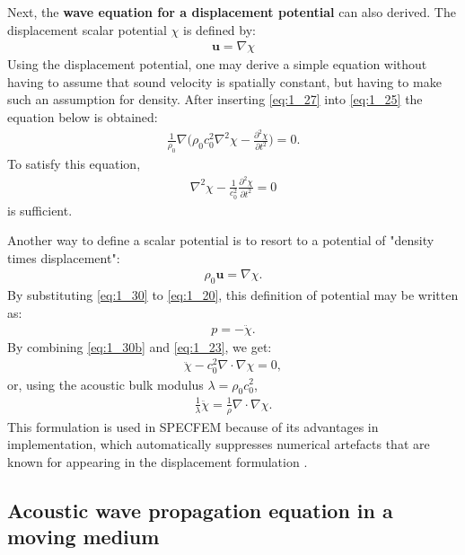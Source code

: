         Next, the \textbf{wave equation for a displacement potential} can also derived. The displacement scalar potential $\chi$ is defined by:
        \begin{align} \label{eq:1_27}
            \bm{u}=\nabla\chi
        \end{align}
        Using the displacement potential, one may derive a simple equation without having to assume that sound velocity is spatially constant,
but having to make such an assumption for density. After inserting \ref{eq:1_27} into \ref{eq:1_25} the equation below is obtained:
        \begin{align} \label{eq:1_28}
            \frac{1}{\rho_0}\nabla\biggl( \rho_0 c_0^2 \nabla^2\chi-\frac{\partial^2 \chi}{\partial t^2} \biggr)=0.
        \end{align}
        To satisfy this equation,
        \begin{align} \label{eq:1_29}
            \nabla^2\chi-\frac{1}{c_0^2}\frac{\partial^2 \chi}{\partial t^2}=0
        \end{align}
        is sufficient.

        Another way to define a scalar potential is to resort to a potential of "density times displacement":
        \begin{align} \label{eq:1_30}
            \rho_0\bm{u}=\nabla\chi.
        \end{align}
        By substituting \ref{eq:1_30} to \ref{eq:1_20}, this definition of potential may be written as:
        \begin{align} \label{eq:1_30b}
            p=-\ddot{\chi}.
        \end{align}
        By combining \ref{eq:1_30b} and \ref{eq:1_23}, we get:
        \begin{align} \label{eq:1_31}
            \ddot\chi - c_0^2\nabla\cdot\nabla\chi = 0,
        \end{align}
        or, using the acoustic bulk modulus $\lambda=\rho_0c_0^2$,
        \begin{align} \label{eq:1_32}
            \frac{1}{\lambda}\ddot\chi=\frac{1}{\rho}\nabla\cdot\nabla\chi.
        \end{align}
        This formulation is used in SPECFEM \parencite{Cristini2012Someillustrativeexamples} because of its advantages in implementation, which automatically
suppresses numerical artefacts that are known for appearing in the displacement formulation \parencite{Hamdi1978Adisplacementmethod}.


    \subsection{Acoustic wave propagation equation in a moving medium}

